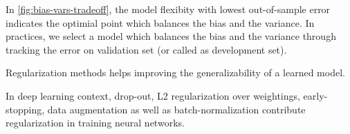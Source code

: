 \documentclass{kthreport}
\begin{document}
In \cref{fig:bias-vars-tradeoff}, the model flexibity with lowest out-of-sample
error indicates the optimial point which balances the bias and the variance.
In practices, we select a model which balances the bias and the variance through
tracking the error on validation set (or called as development set).

Regularization methods helps improving the generalizability of a learned model.

In deep learning context, drop-out, L2 regularization over weightings, early-stopping,
data augmentation as well as batch-normalization
contribute regularization in training neural networks. \cite{luo2018-bn-regularization}


\begin{figure}[!h]
    \begin{minipage}{.5\linewidth}
        \centering
    \end{minipage}%
    \begin{minipage}{.5\linewidth}
        \centering
\end{minipage}
\end{figure}
\end{document}
